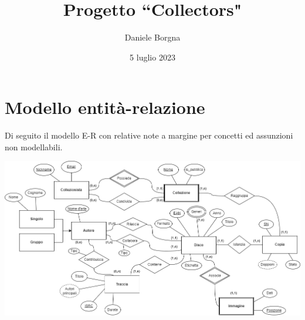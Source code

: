\documentclass{article}
\title{Progetto ``Collectors"}
\author{Daniele Borgna}
\date{5 luglio 2023}
\begin{document}
\maketitle

\pagebreak

\tableofcontents

\pagebreak

\section{Modello entità-relazione}
Di seguito il modello E-R con relative note a margine per concetti ed assunzioni non modellabili.
\begin{center}
    \includegraphics[width=\linewidth]{ER_ldb.png}
\end{center}
\end{document}
